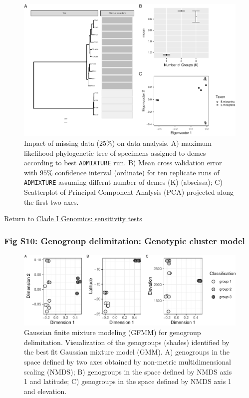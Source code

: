 \documentclass[
  11pt,
]{article}
\begin{document}
\begin{figure}
\includegraphics{Supplementary_Material_files/figure-latex/cladeIgenomicSensitivityAnalysesSmallestplots-1} \caption{Impact of missing data ($25\%$) on data analysis. A) maximum likelihood phylogenetic tree of specimens assigned to demes according to best \texttt{ADMIXTURE} run. B) Mean cross validation error with $95\%$ confidence interval (ordinate) for ten replicate runs of \texttt{ADMIXTURE} assuming differnt number of demes (K) (abscissa); C) Scatterplot of Principal Component Analysis (PCA) projected along the first two axes.}\label{fig:cladeIgenomicSensitivityAnalysesSmallestplots}
\end{figure}

Return to \protect\hyperlink{sensitivity-tests}{Clade I Genomics: sensitivity tests}
\pagebreak

\hypertarget{fig-s10-genogroup-delimitation-genotypic-cluster-model}{%
\subsubsection{Fig S10: Genogroup delimitation: Genotypic cluster model}\label{fig-s10-genogroup-delimitation-genotypic-cluster-model}}

\begin{figure}
\includegraphics{Supplementary_Material_files/figure-latex/cladeImolecularDelimitationsNmms-1} \caption{Gaussian finite mixture modeling (GFMM) for genogroup delimitation. Visualization of the genogroups (shades) identified by the best fit Gaussian mixture model (GMM). A) genogroups in the space defined by two axes obtained by non-metric multidimensional scaling (NMDS); B) genogroups in the space defined by NMDS axis 1 and latitude; C) genogroups in the space defined by NMDS axis 1 and elevation.}\label{fig:cladeImolecularDelimitationsNmms}
\end{figure}
\end{document}
